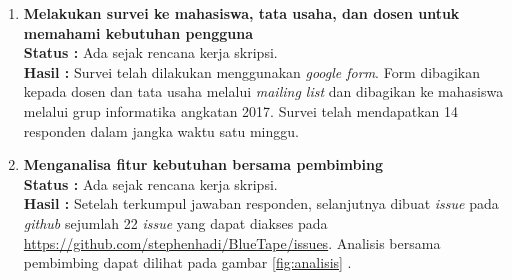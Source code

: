 \documentclass[a4paper,twoside]{article}
\begin{document}
\begin{enumerate}
\begin{enumerate}
\begin{itemize}
		\item \textit{Form} \\
		\textit{Bootstrap} menyediakan kelas yang dapat digunakan untuk menampilkan \textit{form} yang konsisten pada \textit{browser} ataupun \textit{smartphone}.
		
		\item \textit{Nav} \\
		\textit{Nav} adalah komponen yang mengatur navigasi dengan memasukkan kelas \texttt{nav}. Kelas \texttt{nav} dibuat dengan \textit{flexbox} dan menjadi dasar untuk membuat berbagai macam navigasi. Kelas \texttt{nav} dapat ditaruh pada \textit{tag} \texttt{<nav>} atau \texttt{<ul>}. 
	\end{itemize}
	
	\item \textbf{Google OAuth 2.0} \\
	\textit{Google API} menggunakan \textit{OAuth 2.0 protocol}\footnote{\url{https://developers.google.com/identity/protocols/oauth2}} untuk melakukan autentikasi dan otorisasi. Untuk menggunakan \textit{OAuth 2.0} dari \textit{google} diperlukan untuk mendaftar pada \textit{google api console} untuk mendapatkan \textit{client credentials} yang dapat dibuat pada \url{https://console.developers.google.com/apis}. Setelah melakukan pembuatan \textit{project} maka di menu \textit{credentials} dapat dilakukan pembuatan \textit{OAuth client ID} seperti pada gambar \ref{fig:googleapi}.
	
	\begin{figure}[H]
		\centering
		\texttt{[image: googleapi]} 
		\caption{Tampilan \textit{credentials} pada \textit{google API}}
		\label{fig:googleapi} 
	\end{figure}

	\end{enumerate}
		
	\item \textbf{Melakukan survei ke mahasiswa, tata usaha, dan dosen untuk memahami kebutuhan pengguna}\\
	{\bf Status :} Ada sejak rencana kerja skripsi.\\		
	{\bf Hasil :} Survei telah dilakukan menggunakan \textit{google form}. Form dibagikan kepada dosen dan tata usaha melalui \textit{mailing list} dan dibagikan ke mahasiswa melalui grup informatika angkatan 2017. Survei telah mendapatkan 14 responden dalam jangka waktu satu minggu. 

	\item \textbf{Menganalisa fitur kebutuhan bersama pembimbing }\\
	{\bf Status :} Ada sejak rencana kerja skripsi.\\
	{\bf Hasil :} Setelah terkumpul jawaban responden, selanjutnya dibuat \textit{issue} pada \textit{github} sejumlah 22 \textit{issue} yang dapat diakses pada \url{https://github.com/stephenhadi/BlueTape/issues}. Analisis bersama pembimbing dapat dilihat pada gambar \ref{fig:analisis} .
	

\end{enumerate}
\end{document}
